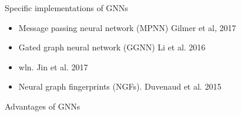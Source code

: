 \documentclass[b5paper]{report}
\begin{document}
Specific implementations of \glspl{GNN}

\begin{itemize}
  \item Message passing neural network (MPNN) Gilmer et al, 2017
  \item Gated graph neural network (GGNN) Li et al. 2016
  \item \acrfull{wln}. Jin et al. 2017
  \item Neural graph fingerprints (NGFs). Duvenaud et al. 2015
\end{itemize}

Advantages of \glspl{GNN}
\end{document}
